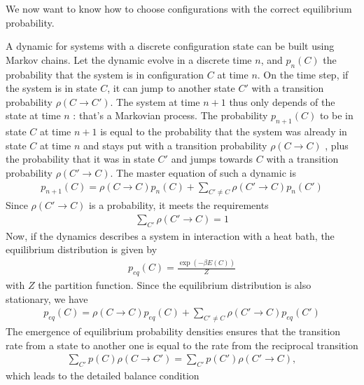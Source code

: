 We now want to know how to choose configurations with the correct  equilibrium probability.

A dynamic for systems with a discrete configuration state can be built using Markov chains. Let the dynamic evolve in a discrete time $n$, and $p_n(C)$ the probability that the system is in configuration $C$ at time $n$. On the time step, if the system is in state $C$, it can jump to another state $C'$ with a transition probability $\rho(C\to C')$. The system at time $n+1$ thus only depends of the state at time $n$ : that's a Markovian process. The probability $p_{n+1}(C)$ to be in state $C$ at time $n+1$ is equal to the probability that the system was already in state $C$ at time $n$ and stays put with a transition probability $\rho(C\to C)$ , plus the probability that it was in state $C'$ and jumps towards $C$ with a transition probability $\rho(C'\to C)$. The master equation of such a dynamic is
\begin{align}
p_{n+1}(C) = \rho(C\to C) p_n(C) + \sum_{C'\neq C} \rho(C'\to C) p_n(C')
\end{align}
Since $\rho(C' \to C)$ is a probability, it meets the requirements 
\begin{align}
\sum_{C'} \rho(C' \to C) = 1
\label{norm}
\end{align}
Now, if the dynamics describes a system in interaction with a heat bath, the equilibrium distribution is given by
\begin{align}
p_{eq}(C) = \frac{\exp(-\beta E(C))}{Z}
\end{align}
with $Z$ the partition function. Since the equilibrium distribution is also stationary, we have
\begin{align}
p_{eq}(C) = \rho(C\to C) p_{eq}(C) + \sum_{C'\neq C} \rho(C'\to C)p_{eq}(C')
\label{p-eq-mc}
\end{align}
The emergence of equilibrium probability densities ensures that the transition rate from a state to another one is equal to the rate from the reciprocal transition
\begin{align}
\sum_{C'} p(C) \rho(C \to C') = \sum_{C'} p(C') \rho(C' \to C),
\end{align}
which leads to the detailed balance condition
\cite{newman_monte_1999} 
